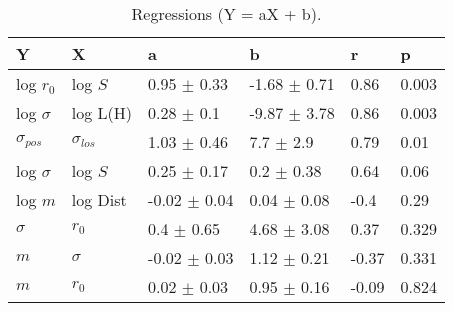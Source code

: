 \begin{table}
\centering
\caption{Regressions (Y = aX + b).}
\begin{tabular}{llllll}
\toprule
              Y &               X &                 a &                 b &      r &      p \\
\midrule
      log $r_0$ &         log $S$ &   0.95 $\pm$ 0.33 &  -1.68 $\pm$ 0.71 &   0.86 &  0.003 \\
   log $\sigma$ &        log L(H) &    0.28 $\pm$ 0.1 &  -9.87 $\pm$ 3.78 &   0.86 &  0.003 \\
 $\sigma_{pos}$ &  $\sigma_{los}$ &   1.03 $\pm$ 0.46 &     7.7 $\pm$ 2.9 &   0.79 &   0.01 \\
   log $\sigma$ &         log $S$ &   0.25 $\pm$ 0.17 &    0.2 $\pm$ 0.38 &   0.64 &   0.06 \\
        log $m$ &        log Dist &  -0.02 $\pm$ 0.04 &   0.04 $\pm$ 0.08 &   -0.4 &   0.29 \\
       $\sigma$ &         $r_{0}$ &    0.4 $\pm$ 0.65 &   4.68 $\pm$ 3.08 &   0.37 &  0.329 \\
            $m$ &        $\sigma$ &  -0.02 $\pm$ 0.03 &   1.12 $\pm$ 0.21 &  -0.37 &  0.331 \\
            $m$ &         $r_{0}$ &   0.02 $\pm$ 0.03 &   0.95 $\pm$ 0.16 &  -0.09 &  0.824 \\
\bottomrule
\end{tabular}
\end{table}
